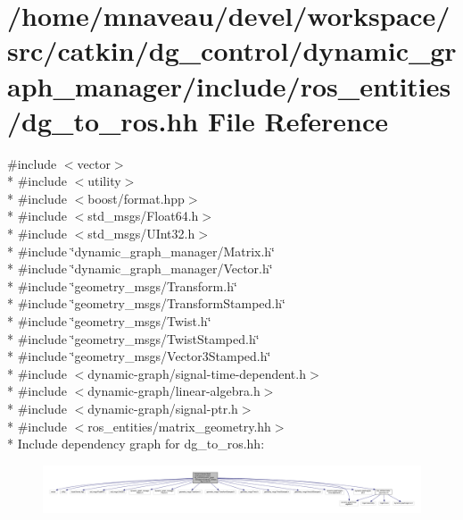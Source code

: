 \hypertarget{dg__to__ros_8hh}{}\section{/home/mnaveau/devel/workspace/src/catkin/dg\+\_\+control/dynamic\+\_\+graph\+\_\+manager/include/ros\+\_\+entities/dg\+\_\+to\+\_\+ros.hh File Reference}
\label{dg__to__ros_8hh}
{\ttfamily \#include $<$vector$>$}\\*
{\ttfamily \#include $<$utility$>$}\\*
{\ttfamily \#include $<$boost/format.\+hpp$>$}\\*
{\ttfamily \#include $<$std\+\_\+msgs/\+Float64.\+h$>$}\\*
{\ttfamily \#include $<$std\+\_\+msgs/\+U\+Int32.\+h$>$}\\*
{\ttfamily \#include \char`\"{}dynamic\+\_\+graph\+\_\+manager/\+Matrix.\+h\char`\"{}}\\*
{\ttfamily \#include \char`\"{}dynamic\+\_\+graph\+\_\+manager/\+Vector.\+h\char`\"{}}\\*
{\ttfamily \#include \char`\"{}geometry\+\_\+msgs/\+Transform.\+h\char`\"{}}\\*
{\ttfamily \#include \char`\"{}geometry\+\_\+msgs/\+Transform\+Stamped.\+h\char`\"{}}\\*
{\ttfamily \#include \char`\"{}geometry\+\_\+msgs/\+Twist.\+h\char`\"{}}\\*
{\ttfamily \#include \char`\"{}geometry\+\_\+msgs/\+Twist\+Stamped.\+h\char`\"{}}\\*
{\ttfamily \#include \char`\"{}geometry\+\_\+msgs/\+Vector3\+Stamped.\+h\char`\"{}}\\*
{\ttfamily \#include $<$dynamic-\/graph/signal-\/time-\/dependent.\+h$>$}\\*
{\ttfamily \#include $<$dynamic-\/graph/linear-\/algebra.\+h$>$}\\*
{\ttfamily \#include $<$dynamic-\/graph/signal-\/ptr.\+h$>$}\\*
{\ttfamily \#include $<$ros\+\_\+entities/matrix\+\_\+geometry.\+hh$>$}\\*
Include dependency graph for dg\+\_\+to\+\_\+ros.\+hh\+:\nopagebreak
\begin{figure}[H]
\begin{center}
\leavevmode
\includegraphics[width=350pt]{dg__to__ros_8hh__incl}
\end{center}
\end{figure}

